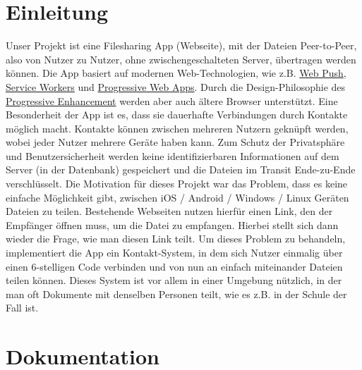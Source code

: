\documentclass[a4paper]{article}
\begin{document}


\setcounter{tocdepth}{2}
\tableofcontents
\newpage

\section{Einleitung}
Unser Projekt ist eine Filesharing App (Webseite), mit der Dateien Peer-to-Peer,
also von Nutzer zu Nutzer, ohne zwischengeschalteten Server, übertragen werden
können. Die App basiert auf modernen Web-Technologien, wie z.B.
\href{https://web.dev/push-notifications-web-push-protocol/}{Web Push},
\href{https://web.dev/learn/pwa/service-workers/}{Service Workers} und
\href{https://web.dev/progressive-web-apps/}{Progressive Web Apps}. Durch die
Design-Philosophie des
\href{https://developer.mozilla.org/en-US/docs/Glossary/Progressive_Enhancement}{Progressive
Enhancement} werden aber auch ältere Browser unterstützt. Eine Besonderheit der
App ist es, dass sie dauerhafte Verbindungen durch Kontakte möglich macht.
Kontakte können zwischen mehreren Nutzern geknüpft werden, wobei jeder Nutzer
mehrere Geräte haben kann. Zum Schutz der Privatsphäre und Benutzersicherheit
werden keine identifizierbaren Informationen auf dem Server (in der Datenbank)
gespeichert und die Dateien im Transit Ende-zu-Ende verschlüsselt. Die
Motivation für dieses Projekt war das Problem, dass es keine einfache
Möglichkeit gibt, zwischen iOS / Android / Windows / Linux Geräten Dateien zu
teilen. Bestehende Webseiten nutzen hierfür einen Link, den der Empfänger öffnen
muss, um die Datei zu empfangen. Hierbei stellt sich dann wieder die Frage, wie
man diesen Link teilt. Um dieses Problem zu behandeln, implementiert die App ein
Kontakt-System, in dem sich Nutzer einmalig über einen 6-stelligen Code
verbinden und von nun an einfach miteinander Dateien teilen können. Dieses
System ist vor allem in einer Umgebung nützlich, in der man oft Dokumente mit
denselben Personen teilt, wie es z.B. in der Schule der Fall ist.

\section{Dokumentation}
\end{document}
